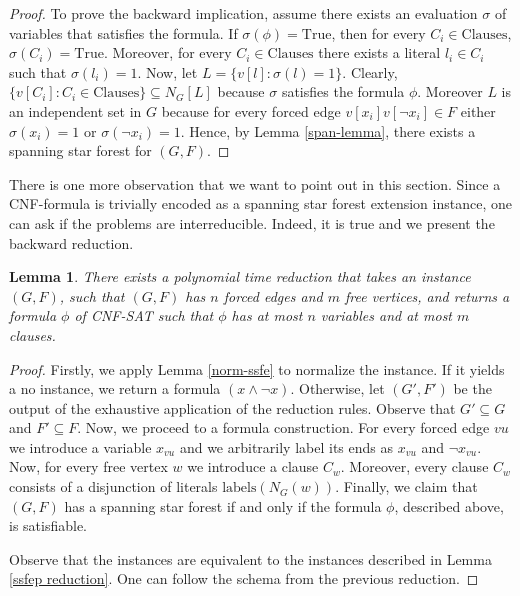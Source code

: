 \documentclass[en]{pracamgr}
\newtheorem{lemma}{Lemma}
\newcommand{\cnfsat}{{\sc CNF-SAT}}
\begin{document}
\begin{proof}
	To prove the backward implication, assume there exists an evaluation $\sigma$ of variables that satisfies the formula. If $\sigma(\phi)=\textrm{True}$, then for every $C_i \in \textrm{Clauses}$, $\sigma(C_i)=\textrm{True}$. Moreover, for every $C_i \in \textrm{Clauses}$ there exists a literal $l_i \in C_i$ such that $\sigma(l_i)=1$. Now, let $L = \{v[l]: \sigma(l)=1\}$. Clearly, $\{v[C_i]: C_i \in \textrm{Clauses}\} \subseteq N_G[L]$ because $\sigma$ satisfies the formula $\phi$. Moreover $L$ is an independent set in $G$ because for every forced edge $v[x_i]v[\neg x_i] \in F$ either $\sigma(x_i)=1$ or $\sigma(\neg x_i)=1$. Hence, by Lemma \ref{span-lemma}, there exists a spanning star forest for $(G,F)$.
\end{proof}

There is one more observation that we want to point out in this section. Since a CNF-formula is trivially encoded as a spanning star forest extension instance, one can ask if the problems are interreducible. Indeed, it is true and we present the backward reduction.

\begin{lemma}\label{cnfsat reduction}
	There exists a polynomial time reduction that takes an instance $(G,F)$, such that $(G,F)$ has $n$ forced edges and $m$ free vertices, and returns a formula $\phi$ of \cnfsat{} such that $\phi$ has at most $n$ variables and at most $m$ clauses.
\end{lemma}

\begin{proof}
	Firstly, we apply Lemma \ref{norm-ssfe} to normalize the instance. If it yields a no instance, we return a formula $(x \land \neg x)$. Otherwise, let $(G',F')$ be the output of the exhaustive application of the reduction rules. Observe that $G' \subseteq G$ and $F' \subseteq F$. Now, we proceed to a formula construction. For every forced edge $vu$ we introduce a variable $x_{vu}$ and we arbitrarily label its ends as $x_{vu}$ and $\neg x_{vu}$. Now, for every free vertex $w$ we introduce a clause $C_w$. Moreover, every clause $C_w$ consists of a disjunction of literals $\textrm{labels}(N_G(w))$. Finally, we claim that $(G,F)$ has a spanning star forest if and only if the formula $\phi$, described above, is satisfiable.
	
	Observe that the instances are equivalent to the instances described in Lemma \ref{ssfep reduction}. One can follow the schema from the previous reduction.
\end{proof}
\end{document}
